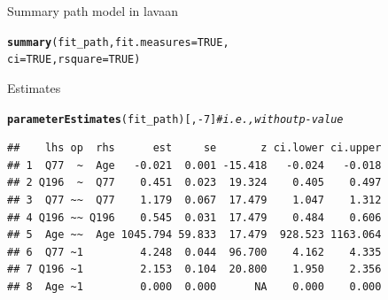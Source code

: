 \documentclass[10pt]{beamer}\usepackage[]{graphicx}\usepackage[]{xcolor}
\makeatletter
\newcommand{\hlnum}[1]{\textcolor[rgb]{0.686,0.059,0.569}{#1}}%
\newcommand{\hlcom}[1]{\textcolor[rgb]{0.678,0.584,0.686}{\textit{#1}}}%
\newcommand{\hlopt}[1]{\textcolor[rgb]{0,0,0}{#1}}%
\newcommand{\hlstd}[1]{\textcolor[rgb]{0.345,0.345,0.345}{#1}}%
\newcommand{\hlkwc}[1]{\textcolor[rgb]{0.333,0.667,0.333}{#1}}%
\newcommand{\hlkwd}[1]{\textcolor[rgb]{0.737,0.353,0.396}{\textbf{#1}}}%
\newenvironment{kframe}{%
 \def\at@end@of@kframe{}%
 \ifinner\ifhmode%
  \def\at@end@of@kframe{\end{minipage}}%
  \begin{minipage}{\columnwidth}%
 \fi\fi%
 \def\FrameCommand##1{\hskip\@totalleftmargin \hskip-\fboxsep
 \colorbox{shadecolor}{##1}\hskip-\fboxsep
     \hskip-\linewidth \hskip-\@totalleftmargin \hskip\columnwidth}%
 \MakeFramed {\advance\hsize-\width
   \@totalleftmargin\z@ \linewidth\hsize
   \@setminipage}}%
 {\par\unskip\endMakeFramed%
 \at@end@of@kframe}
\newenvironment{knitrout}{}{} %
\makeatother
\begin{document}
\begin{frame}[fragile]{Summary path model in lavaan}

\begin{knitrout}
\color{fgcolor}\begin{kframe}
\begin{alltt}
\hlkwd{summary}\hlstd{(fit_path,} \hlkwc{fit.measures} \hlstd{=} \hlnum{TRUE}\hlstd{,}
        \hlkwc{ci} \hlstd{=} \hlnum{TRUE}\hlstd{,} \hlkwc{rsquare} \hlstd{=} \hlnum{TRUE}\hlstd{)}
\end{alltt}
\end{kframe}
\end{knitrout}

Estimates 
\begin{knitrout}
\color{fgcolor}\begin{kframe}
\begin{alltt}
\hlkwd{parameterEstimates}\hlstd{(fit_path)[,}\hlopt{-}\hlnum{7}\hlstd{]} \hlcom{# i.e., without p-value}
\end{alltt}
\begin{verbatim}
##    lhs op  rhs      est     se       z ci.lower ci.upper
## 1  Q77  ~  Age   -0.021  0.001 -15.418   -0.024   -0.018
## 2 Q196  ~  Q77    0.451  0.023  19.324    0.405    0.497
## 3  Q77 ~~  Q77    1.179  0.067  17.479    1.047    1.312
## 4 Q196 ~~ Q196    0.545  0.031  17.479    0.484    0.606
## 5  Age ~~  Age 1045.794 59.833  17.479  928.523 1163.064
## 6  Q77 ~1         4.248  0.044  96.700    4.162    4.335
## 7 Q196 ~1         2.153  0.104  20.800    1.950    2.356
## 8  Age ~1         0.000  0.000      NA    0.000    0.000
\end{verbatim}
\end{kframe}
\end{knitrout}

\end{frame}
%
\end{document}
